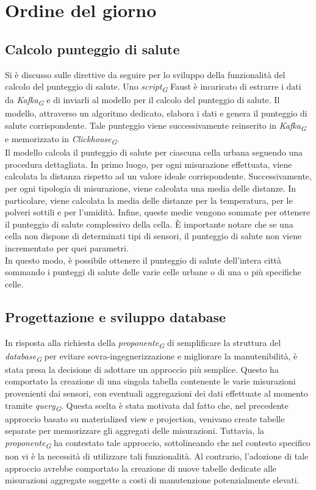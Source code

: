 \documentclass{article}
\begin{document}
\section{Ordine del giorno}
    \subsection{Calcolo punteggio di salute}
    Si è discusso sulle direttive da seguire per lo sviluppo della funzionalità del calcolo del punteggio di salute. Uno \textit{script}\textsubscript{\textit{G}} Faust è incaricato di estrarre i dati da \textit{Kafka}\textsubscript{\textit{G}} e di inviarli al modello per il calcolo del punteggio di salute. Il modello, attraverso un algoritmo dedicato, elabora i dati e genera il punteggio di salute corrispondente. Tale punteggio viene successivamente reinserito in \textit{Kafka}\textsubscript{\textit{G}} e memorizzato in \textit{Clickhouse}\textsubscript{\textit{G}}. \\
    Il modello calcola il punteggio di salute per ciascuna cella urbana seguendo una procedura dettagliata. In primo luogo, per ogni misurazione effettuata, viene calcolata la distanza rispetto ad un valore ideale corrispondente. Successivamente, per ogni tipologia di misurazione, viene calcolata una media delle distanze. In particolare, viene calcolata la media delle distanze per la temperatura, per le polveri sottili e per l'umidità. Infine, queste medie vengono sommate per ottenere il punteggio di salute complessivo della cella. È importante notare che se una cella non dispone di determinati tipi di sensori, il punteggio di salute non viene incrementato per quei parametri. \\
    In questo modo, è possibile ottenere il punteggio di salute dell'intera città sommando i punteggi di salute delle varie celle urbane o di una o più specifiche celle.

    \subsection{Progettazione e sviluppo database}
    In risposta alla richiesta della \textit{proponente}\textsubscript{\textit{G}} di semplificare la struttura del \textit{database}\textsubscript{\textit{G}} per evitare sovra-ingegnerizzazione e migliorare la manutenibilità, è stata presa la decisione di adottare un approccio più semplice. Questo ha comportato la creazione di una singola tabella contenente le varie misurazioni provenienti dai sensori, con eventuali aggregazioni dei dati effettuate al momento tramite \textit{query}\textsubscript{\textit{G}}. Questa scelta è stata motivata dal fatto che, nel precedente approccio basato su materialized view e projection, venivano create tabelle separate per memorizzare gli aggregati delle misurazioni. Tuttavia, la \textit{proponente}\textsubscript{\textit{G}} ha contestato tale approccio, sottolineando che nel contesto specifico non vi è la necessità di utilizzare tali funzionalità. Al contrario, l'adozione di tale approccio avrebbe comportato la creazione di nuove tabelle dedicate alle misurazioni aggregate soggette a costi di manutenzione potenzialmente elevati.
\end{document}

